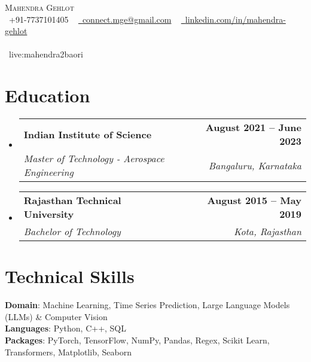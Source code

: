 \documentclass[letterpaper,11pt]{article}
\makeatletter
\newcommand{\resumeSubheading}[4]{
  \vspace{-2pt}\item
    \begin{tabular*}{1.0\textwidth}[t]{l@{\extracolsep{\fill}}r}
      \textbf{#1} & \textbf{\small #2} \\
      \textit{\small#3} & \textit{\small #4} \\
    \end{tabular*}\vspace{-7pt}
}
\newcommand{\resumeSubHeadingListStart}{\begin{itemize}[leftmargin=0.0in, label={}]}
\newcommand{\resumeSubHeadingListEnd}{\end{itemize}}
\makeatother
\begin{document}

\begin{center}
    {\Huge \scshape Mahendra Gehlot} \\ \vspace{8pt}
    \small \raisebox{-0.1\height}\faPhone\ +91-7737101405 ~ 
    \href{mailto:connect.mge@gmail.com}{\raisebox{-0.2\height}\faEnvelope\ {connect.mge@gmail.com}} ~
    \href{https://www.linkedin.com/in/mahendra-gehlot}{\raisebox{-0.2\height}\faLinkedin\ {linkedin.com/in/mahendra-gehlot}}  ~ 
    \vspace{4pt}
    \\\\{\faSkype\ {live:mahendra2baori}} ~
    \href{https://github.com/mahendra-gehlot}{\raisebox{-0.2\height}}  ~ 
    \vspace{-12pt}
\end{center}

\section{Education}
  \resumeSubHeadingListStart
    \resumeSubheading
      {Indian Institute of Science}{August 2021 -- June 2023}
      {Master of Technology - Aerospace Engineering}{Bangaluru, Karnataka}
  \resumeSubHeadingListEnd
  \resumeSubHeadingListStart
    \resumeSubheading
      {Rajasthan Technical University}{August 2015 -- May 2019}
      {Bachelor of Technology}{Kota, Rajasthan}
  \resumeSubHeadingListEnd
\vspace{-8pt}

\section{Technical Skills}
 \begin{itemize}[leftmargin=0.15in, label={}]
    \small{\item{
    \textbf{Domain}{: Machine Learning, Time Series Prediction, Large Language Models (LLMs) \& Computer Vision} \\
     \vspace{4pt}
     \textbf{Languages}{: Python, C++, SQL} \\
     \vspace{4pt}
     \textbf{Packages}{: PyTorch, TensorFlow, NumPy, Pandas, Regex, Scikit Learn, Transformers, Matplotlib, Seaborn} \\
    }}
 \end{itemize}
\end{document}
